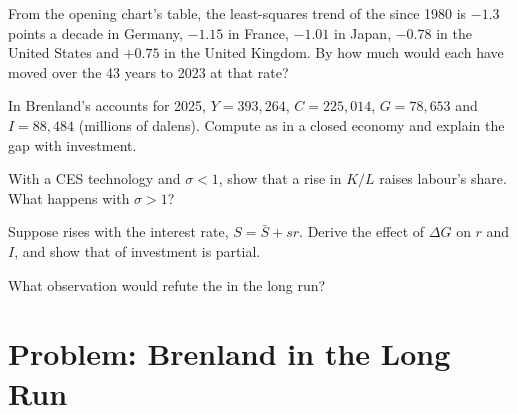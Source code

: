 \begin{exercise}[$\star\star$]\label{exo:b1:long-run-model:trend}
From the opening chart's table, the least-squares trend of the 
since 1980 is $-1.3$ points a decade in Germany, $-1.15$ in France, $-1.01$ in
Japan, $-0.78$ in the United States and $+0.75$ in the United Kingdom.
By how much would each have moved over the 43 years to 2023 at that rate?
\end{exercise}

\begin{exercise}[$\star\star$]\label{exo:b1:long-run-model:brenland}
In Brenland's accounts for 2025, $Y = 393{,}264$, $C = 225{,}014$, $G = 78{,}653$ and
$I = 88{,}484$ (millions of dalens). Compute  as in a closed
economy and explain the gap with investment.
\end{exercise}

\begin{exercise}[$\star\star\star$]\label{exo:b1:long-run-model:ces}
With a CES technology and $\sigma < 1$, show that a rise in $K/L$ raises labour's
share. What happens with $\sigma > 1$?
\end{exercise}

\begin{exercise}[$\star\star\star$]\label{exo:b1:long-run-model:partial}
Suppose  rises with the interest rate, $S = \bar S + sr$. Derive the
effect of $\Delta G$ on $r$ and $I$, and show that  of investment is
partial.
\end{exercise}

\begin{exercise}[$\star\star\star$]\label{exo:b1:long-run-model:neutral-ex}
What observation would refute the  in the long run?
\end{exercise}

\section{Problem: Brenland in the Long Run}\label{sec:b1:long-run-model:problem}

